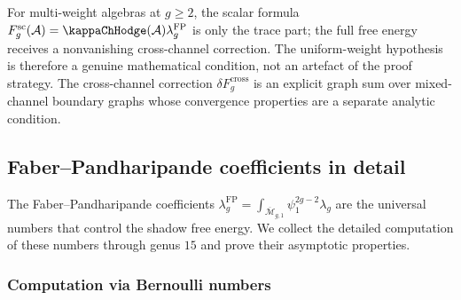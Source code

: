 \begin{remark}
\label{rem:multi-weight-scope}
For multi-weight algebras at $g \geq 2$, the scalar formula
$F_g^{\mathrm{sc}}(\cA)=\kappaChHodge(\cA)\lambda_g^{\mathrm{FP}}$
is only the trace part; the full free energy receives a
nonvanishing cross-channel correction. The uniform-weight hypothesis is therefore a
genuine mathematical condition, not an artefact of the proof
strategy. The cross-channel correction
$\delta F_g^{\mathrm{cross}}$ is an explicit graph sum over
mixed-channel boundary graphs whose convergence properties are a
separate analytic condition.
\end{remark}



\subsection{Faber--Pandharipande coefficients in detail}

The Faber--Pandharipande coefficients
$\lambda_g^{\mathrm{FP}}
=\int_{\overline{\mathcal{M}}_{g,1}}\psi_1^{2g-2}\lambda_g$
are the universal numbers that control the shadow free energy. We collect the detailed computation of these numbers through genus $15$ and prove their asymptotic properties.

\subsubsection{Computation via Bernoulli numbers}

